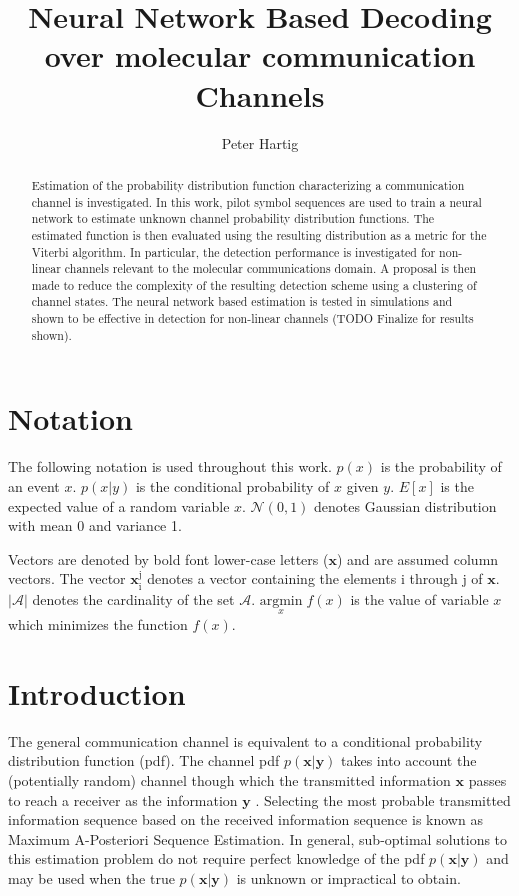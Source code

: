 \documentclass[12pt,a4paper]{report}
\title{Neural Network Based Decoding over molecular communication Channels}
\author{Peter Hartig}
\begin{document}
\maketitle

\begin{abstract}
Estimation of the probability distribution function characterizing a communication channel is investigated. In this work, pilot symbol sequences are used to train a neural network to estimate unknown channel probability distribution functions. The estimated function is then evaluated using the resulting distribution as a metric for the Viterbi algorithm. In particular, the detection performance is investigated for non-linear channels relevant to the molecular communications domain. A proposal is then made to reduce the complexity of the resulting detection scheme using a clustering of channel states. The neural network based estimation is tested in simulations and shown to be effective in detection for non-linear channels (TODO Finalize for results shown). 
\end{abstract}

\newpage
\tableofcontents
\newpage
\section{Notation}
The following notation is used throughout this work.
$p(x)$ is the probability of an event $x$.
$p(x|y)$ is the conditional probability of $x$ given $y$.
$E[x]$ is the expected value of a random variable $x$.
$\mathcal{N}(0,1)$ denotes Gaussian distribution with mean 0 and variance 1. 

Vectors are denoted by bold font lower-case letters ($\mathbf{x}$) and are assumed column vectors.
The vector $\mathbf{x}_{\mathrm{i}}^{\mathrm{j}}$ denotes a vector containing the elements i through j of $\mathbf{x}$. $|\mathcal{A}|$ denotes the cardinality of the set $\mathcal{A}$.
$\underset{x}{\text{argmin}} \; f(x)$ is the value of variable $x$ which minimizes the function $f(x)$.

\section{Introduction}

The general communication channel is equivalent to a conditional probability distribution function (pdf). The channel pdf $p(\mathbf{x}|\mathbf{y})$ takes into account the (potentially random) channel though which the transmitted information $\mathbf{x}$ passes to reach a receiver as the information $\mathbf{y}$ \cite[Ch.~7]{cover2012elements}. Selecting the most probable transmitted information sequence based on the received information sequence is known as Maximum A-Posteriori Sequence Estimation. In general, sub-optimal solutions to this estimation problem do not require perfect knowledge of the pdf $p(\mathbf{x}|\mathbf{y})$ and may be used when the true $p(\mathbf{x}|\mathbf{y})$ is unknown or impractical to obtain.
\end{document}
